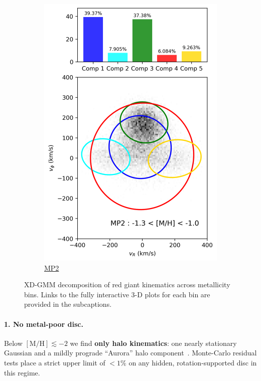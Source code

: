 \documentclass[a4paper,10pt]{article}
\begin{document}
\begin{multicols}{2}
\begin{figure}[H]
\begin{subfigure}[t]{0.24\linewidth}
    \includegraphics[width=\linewidth]{../figures/gmm_MP2.png}
    \caption{\href{https://raw.githack.com/raunaq-rai/Disentangling-the-Milky-Way-using-GMM/main/figures/MP2\_\_-1.3\%5BM\_H\%5D-1.0.html}{MP2}}
    \label{fig:gmm_mp2}
  \end{subfigure}

  \caption{XD-GMM decomposition of red giant kinematics across metallicity bins. Links to the fully interactive 3-D plots for each bin are provided in the subcaptions.}
  \label{fig:gmm_zhang}
\end{figure}

\paragraph{1. No metal-poor disc.}
Below $\mathrm{[M/H]}\lesssim-2$ we find \textbf{only halo kinematics}: one
nearly stationary Gaussian and a mildly prograde “Aurora” halo
component~\cite{Belokurov2022}.  Monte-Carlo residual tests place a strict
upper limit of $<1\%$ on any hidden, rotation-supported disc in this regime.


\end{multicols}
\end{document}
